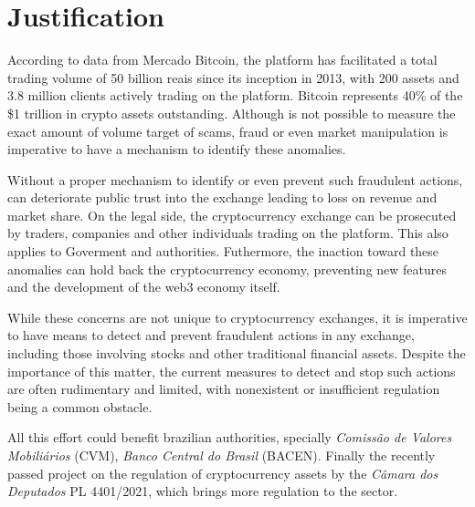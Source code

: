 \section{Justification}
According to data from Mercado Bitcoin, the platform has facilitated a total trading volume of 50 billion reais since
its inception in 2013, with 200 assets and 3.8 million clients actively trading on the platform. Bitcoin represents 40\%
of the \$1 trillion in crypto assets outstanding. Although is not possible to measure the exact amount of volume target
of scams, fraud or even market manipulation is imperative to have a mechanism to identify these anomalies.

Without a proper mechanism to identify or even prevent such fraudulent actions, can deteriorate public trust into the
exchange leading to loss on revenue and market share. On the legal side, the cryptocurrency exchange can be prosecuted
by traders, companies and other individuals trading on the platform. This also applies to Goverment and authorities.
Futhermore, the inaction toward these anomalies can hold back the cryptocurrency economy, preventing new features and
the development of the web3 economy itself.

While these concerns are not unique to cryptocurrency exchanges, it is imperative to have means to detect and prevent
fraudulent actions in any exchange, including those involving stocks and other traditional financial assets. Despite the
importance of this matter, the current measures to detect and stop such actions are often rudimentary and limited, with
nonexistent or insufficient regulation being a common obstacle.

All this effort could benefit brazilian authorities, specially \textit{Comissão de Valores Mobiliários} (CVM),
\textit{Banco Central do Brasil} (BACEN). Finally the recently passed project on the regulation of cryptocurrency assets
by the \textit{Câmara dos Deputados} PL 4401/2021, which brings more regulation to the sector.
